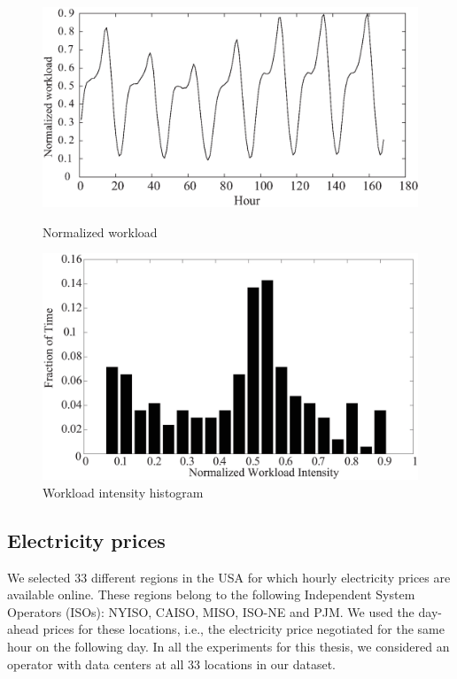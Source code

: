 \begin{figure}%
  \begin{minipage}[b]{0.5\linewidth}
    \centering
    \includegraphics[width=\linewidth]{pics/workloadr.eps}
    \caption{Normalized workload}
    \label{fig:workloadr}
  \end{minipage}
  \hspace{0.5cm}
  \begin{minipage}[b]{0.5\linewidth}
    \centering
    \includegraphics[width=\linewidth]{pics/workloadhist-new.eps}
    \caption{Workload intensity histogram}
    \label{fig:workloadhist}
  \end{minipage}
\end{figure}

\subsection{Electricity prices}
\label{subsec:prices} We selected $33$ different regions in the USA for which hourly electricity prices are available online. These regions belong to the following Independent System Operators (ISOs): NYISO, CAISO, MISO, ISO-NE and PJM. %
We used the day-ahead prices for these locations, i.e., the electricity price negotiated for the same hour on the following day. In all the experiments for this thesis, we considered an operator with data centers at all 33 locations in our dataset. 

